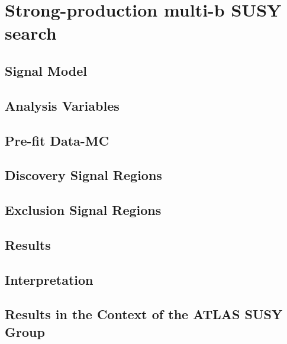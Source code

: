 \chapter{Strong-production multi-b SUSY search}
\label{chap:strong_prod}


\section{Signal Model}

\section{Analysis Variables}


\section{Pre-fit Data-MC}


\section{Discovery Signal Regions}


\section{Exclusion Signal Regions}


\section{Results}


\section{Interpretation}

\section{Results in the Context of the ATLAS SUSY Group}